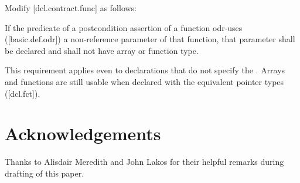 Modify [dcl.contract.func] as follows:

\begin{adjustwidth}{0.5cm}{0.5cm}
If the predicate of a postcondition assertion of a function odr-uses ([basic.def.odr]) a
non-reference parameter of that function, that parameter shall be declared  and shall not have array or function type.
\begin{note}
This requirement applies even to declarations
that do not specify the . Arrays and functions are still usable when declared with the equivalent pointer types ([dcl.fct]).
\end{note}
\begin{example}
\tcode{[...]}
\end{example}

\end{adjustwidth}


\section*{Acknowledgements}
Thanks to Alisdair Meredith and John Lakos for their helpful remarks during drafting of this paper.


\renewcommand{\addcontentsline}[3]{}%







